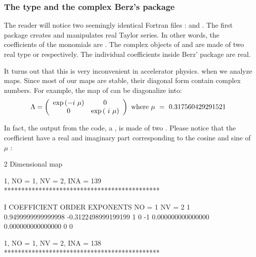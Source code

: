 \documentclass[english,12pt,article]{article} %
\begin{document}
{  \subsubsection{The type {} and the complex Berz's package }
  
  The reader will notice two seemingly identical Fortran files :  and  . The first package creates and manipulates real Taylor series. In other words, the coefficients of the monomials are . 
  The complex objects of  and   are made of two real type   or    respectively. The individual coefficients inside Berz' package  are real.
  
  It turns out that this is very inconvenient in accelerator physics. when we analyze maps. Since most of our maps are stable, their diagonal form contain complex numbers. For example, the map  of  can be diagonalize 
  into:
%
\begin{align} \Lambda =
\left({\begin{array}{cc}\exp\left({-i\ \mu }\right)&0\\
0&\exp\left({\ i\ \mu }\right)\end{array}}\right)~{\rm w}{\rm h}{\rm e}{\rm r}{\rm e}~\mu \ =
\ 0.317560429291521 \label{eq:lam}\end{align}

In fact, the output  from the code, a ,   is made of two . Please notice that the coefficient have a real and imaginary part  corresponding to the cosine and sine of $\mu$ :

\begin{example}
           2  Dimensional map

          1, NO =    1, NV =    2, INA =  139
 *********************************************

    I  COEFFICIENT          ORDER   EXPONENTS
      NO =     1      NV =     2
   1  0.9499999999999998     -0.3122498999199199       1  0
    -1   0.000000000000000       0.000000000000000       0  0

          1, NO =    1, NV =    2, INA =  138
 *********************************************


\end{example}}
\end{document}
